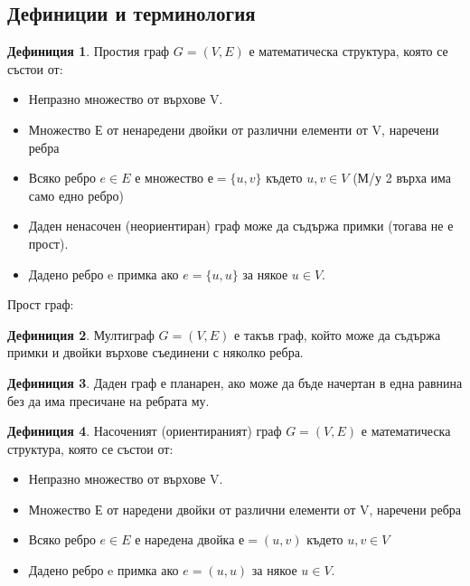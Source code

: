 \documentclass[fleqn, 12pt]{article}
\theoremstyle{definition}
\newtheorem{definition}{Дефиниция}[subsection]
\begin{document}
\subsection{Дефиниции и терминология}

\begin{definition}
Простия	 граф $G = (V,E)$ е математическа структура, която се състои от:
\begin{itemize}
\item Непразно множество от върхове V.
\item Множество Е от ненаредени двойки от различни елементи от V, наречени ребра
\item Всяко ребро $e \in E$ е множество $е = \{ u,v \}$ където $u,v \in V$ (М/у 2 върха има само едно ребро)
\item Даден ненасочен (неориентиран) граф може да съдържа примки (тогава не е прост).
\item Дадено ребро e примка ако $e = \{u, u\}$ за някое $u \in V$.
\end{itemize}
Прост граф:\\
\end{definition}

\begin{definition}
Мултиграф $G = (V, E)$ е такъв граф, който може да съдържа примки и двойки върхове съединени с няколко ребра.
\end{definition}

\begin{definition}
Даден граф е планарен, ако може да бъде начертан в една равнина без да има пресичане на ребрата му.
\end{definition}

\begin{definition}
Насоченият (ориентираният) граф $G = (V, E)$ е математическа структура, която се състои от:
\begin{itemize}
\item Непразно множество от върхове V.
\item Множество Е от наредени двойки от различни елементи от V, наречени ребра
\item Всяко ребро $e \in E$ е наредена двойка $е = ( u, v )$ където $u,v \in V$
\item Дадено ребро e примка ако $e = ( u, u )$ за някое $u \in V$.
\end{itemize}
\end{definition}
\end{document}
